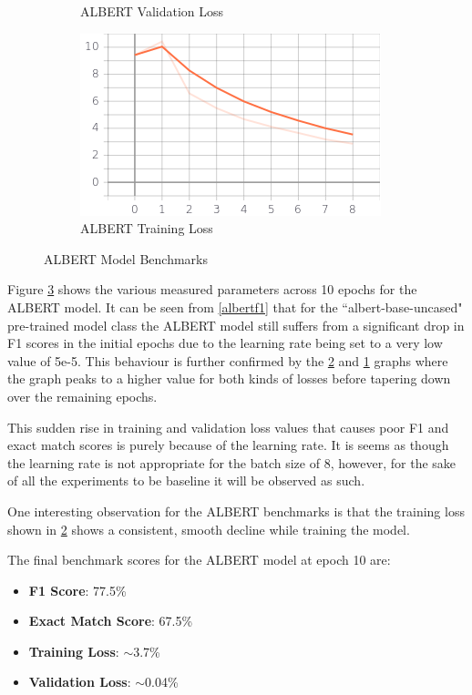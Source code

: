 \documentclass[a4paper,12pt]{report}
\begin{document}
\begin{figure}
\begin{subfigure}[b]{0.4\textwidth}
    			\caption{\small ALBERT Validation Loss}
    			\label{albertValLoss}
    		\end{subfigure}
    		\hfill
    		\begin{subfigure}[b]{0.4\textwidth}
    			\centering
    			\includegraphics[width=\textwidth]{../images/Albert_Train_Loss.png}
    			\caption{\small ALBERT Training Loss}
    			\label{albertTrainLoss}
    		\end{subfigure}
    		\caption{ALBERT Model Benchmarks}
    		\label{albertBenchmarks}
    	\end{figure}

    	Figure \ref{albertBenchmarks} shows the various measured parameters across 10 epochs for the ALBERT model. It can be seen from \ref{albertf1} that for the ``albert-base-uncased" pre-trained model class the ALBERT model still suffers from a significant drop in F1 scores in the initial epochs due to the learning rate being set to a very low value of 5e-5. This behaviour is further confirmed by the \ref{albertTrainLoss} and \ref{albertValLoss} graphs where the graph peaks to a higher value for both kinds of losses before tapering down over the remaining epochs.

    	This sudden rise in training and validation loss values that causes poor F1 and exact match scores is purely because of the learning rate. It is seems as though the learning rate is  not appropriate for the batch size of 8, however, for the sake of all the experiments to be baseline it will be observed as such.

    	One interesting observation for the ALBERT benchmarks is that the training loss shown in \ref{albertTrainLoss} shows a consistent, smooth decline while training the model.


    	The final benchmark scores for the ALBERT model at epoch 10 are:
    	\begin{itemize}
    		\item \textbf{F1 Score}: 77.5\%
    		\item \textbf{Exact Match Score}: 67.5\%
    		\item \textbf{Training Loss}:  $\sim$3.7\%
    		\item \textbf{Validation Loss}: $\sim$0.04\%
    	\end{itemize}
\end{document}
